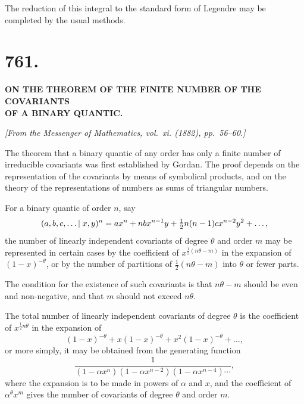 \documentclass[11pt,a4paper]{book}
\begin{document}
The reduction of this integral to the standard form of Legendre may be
completed by the usual methods.

\newpage


\section*{761.}

\begin{center}
\textbf{ON THE THEOREM OF THE FINITE NUMBER OF THE COVARIANTS}\\[3pt]
\textbf{OF A BINARY QUANTIC.}
\end{center}

\begin{flushright}
\textit{[From the Messenger of Mathematics, vol.~xi. (1882), pp.~56--60.]}
\end{flushright}

The theorem that a binary quantic of any order has only a finite number of
irreducible covariants was first established by Gordan. The proof depends on
the representation of the covariants by means of symbolical products, and on
the theory of the representations of numbers as sums of triangular numbers.

For a binary quantic of order $n$, say
%
\[
(a, b, c, \ldots \mspace{-2mu}\mid x, y)^n
= a x^n + n b x^{n-1} y + \tfrac{1}{2}n(n-1) c x^{n-2} y^2 + \ldots,
\]
%
the number of linearly independent covariants of degree $\theta$ and order $m$
may be represented in certain cases by the coefficient of $x^{\frac{1}{2}(n\theta-m)}$
in the expansion of $(1-x)^{-\theta}$, or by the number of partitions of
$\tfrac{1}{2}(n\theta-m)$ into $\theta$ or fewer parts.

The condition for the existence of such covariants is that $n\theta - m$ should
be even and non-negative, and that $m$ should not exceed $n\theta$.

The total number of linearly independent covariants of degree $\theta$ is
the coefficient of $x^{\frac{1}{2}n\theta}$ in the expansion of
%
\[
(1-x)^{-\theta} + x(1-x)^{-\theta} + x^2(1-x)^{-\theta} + \ldots,
\]
%
or more simply, it may be obtained from the generating function
%
\[
\frac{1}{(1-\alpha x^n)(1-\alpha x^{n-2})(1-\alpha x^{n-4})\cdots},
\]
%
where the expansion is to be made in powers of $\alpha$ and $x$, and the coefficient
of $\alpha^{\theta} x^m$ gives the number of covariants of degree $\theta$ and order $m$.
\end{document}
